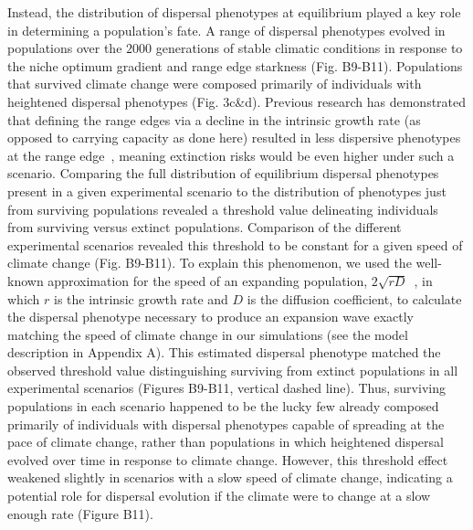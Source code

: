 \documentclass[11pt]{article}
\begin{document}
Instead, the distribution of dispersal phenotypes at equilibrium played a key role in determining a population's fate. A range of dispersal phenotypes evolved in populations over the $2000$ generations of stable climatic conditions in response to the niche optimum gradient and range edge starkness (Fig. B9-B11). Populations that survived climate change were composed primarily of individuals with heightened dispersal phenotypes (Fig. 3c\&d). Previous research has demonstrated that defining the range edges via a decline in the intrinsic growth rate (as opposed to carrying capacity as done here) resulted in less dispersive phenotypes at the range edge~\citep{henry2013eco}, meaning extinction risks would be even higher under such a scenario. Comparing the full distribution of equilibrium dispersal phenotypes present in a given experimental scenario to the distribution of phenotypes just from surviving populations revealed a threshold value delineating individuals from surviving versus extinct populations. Comparison of the different experimental scenarios revealed this threshold to be constant for a given speed of climate change (Fig. B9-B11). To explain this phenomenon, we used the well-known approximation for the speed of an expanding population, $2\sqrt{rD}$~\citep{fisher1937wave, hastings2005spatial}, in which $r$ is the intrinsic growth rate and $D$ is the diffusion coefficient, to calculate the dispersal phenotype necessary to produce an expansion wave exactly matching the speed of climate change in our simulations (see the model description in Appendix A). This estimated dispersal phenotype matched the observed threshold value distinguishing surviving from extinct populations in all experimental scenarios (Figures B9-B11, vertical dashed line). Thus, surviving populations in each scenario happened to be the lucky few already composed primarily of individuals with dispersal phenotypes capable of spreading at the pace of climate change, rather than populations in which heightened dispersal evolved over time in response to climate change. However, this threshold effect weakened slightly in scenarios with a slow speed of climate change, indicating a potential role for dispersal evolution if the climate were to change at a slow enough rate (Figure B11).
\end{document}
